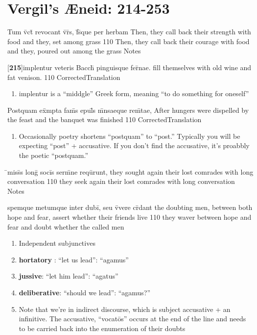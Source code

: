 \section{Vergil's {\AE}neid:  214-253} %

\latline
  {Tum v\={\macron {\i}}ct\={} revocant v\={\macron {\i}}r\={\macron {\i}}s, f\={}s\={\macron {\i}}que per herbam}
  { Then, they call back their strength with food and they, set among grass }
  {110}
  { Then, they call back their courage with food and they, poured out among the grass }
  { Notes }


\latline
  {[\textbf{215}]implentur veteris Bacch\={\macron {\i}} pinguisque fer\={\macron {\i}}nae.}
  { fill themselves with old wine and fat venison. }
  {110}
  { CorrectedTranslation }
  { \begin{enumerate}
  	\item implentur is a ``middgle'' Greek form, meaning ``to do something for oneself''
  \end{enumerate} }


\latline
  {Postquam ex\={}mpta fam\={}s epul\={\macron {\i}}s m\={}nsaeque rem\={}tae,}
  { After hungers were dispelled by the feast and the banquet was finished }
  {110}
  { CorrectedTranslation }
  { \begin{enumerate}
  	\item Occasionally poetry shortens ``postquam'' to ``post.'' Typically you
    will be expecting ``post'' + accusative. If you don't find the accusative,
    it's proabbly the poetic ``postquam.''
  \end{enumerate} }


\latline
  {\={}miss\={}s long\={} soci\={}s serm\={}ne requ\={\macron {\i}}runt,}
  { they sought again their lost comrades with long conversation }
  {110}
  { they seek again their lost comrades with long conversation }
  { Notes }


\latline
  {spemque metumque inter dubi\={\macron {\i}}, seu v\={\macron {\i}}vere cr\={}dant}
  { the doubting men, between both hope and fear, assert whether their friends live }
  {110}
  { they waver between hope and fear and doubt whether the called men}
  { \begin{enumerate}
  	\item Independent subjunctives
		\item \textbf{hortatory} :  ``let us lead'':  ``agamus''
		\item \textbf{jussive}:  ``let him lead'': ``agatus''
		\item \textbf{deliberative}:  ``should we lead'': ``agamus?''
		\item Note that we're in indirect discourse, which is subject accusative +
    an infinitive. The accusative, ``vocat\={o}s'' occurs at the end of the
    line and needs to be carried back into the enumeration of their doubts
  \end{enumerate} }


